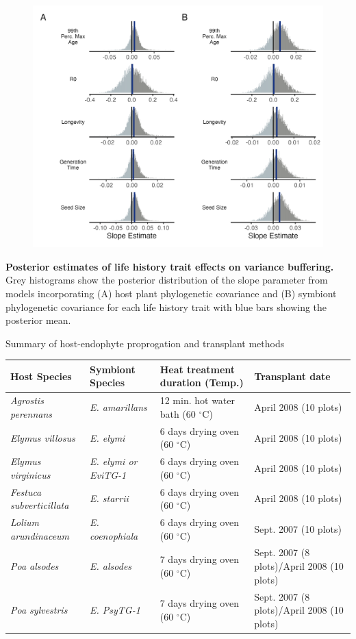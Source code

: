 \documentclass[12pt]{article}
\begin{document}
\begin{figure}
	\centering
	\includegraphics[width=.8\linewidth]{lh_slopes_plot.png}
\end{figure}
 \textbf{Posterior estimates of life history trait effects on variance buffering.} Grey histograms show the posterior distribution of the slope parameter from models incorporating (A) host plant phylogenetic covariance and (B) symbiont phylogenetic covariance for each life history trait with blue bars showing the posterior mean.
\newpage




 Summary of host-endophyte proprogation and transplant methods\\
\begin{table}[ht]
	\begin{adjustbox}{width=1\textwidth}
\begin{tabular}{|l|l|l|l|}
\hline
	\bf{Host Species} & \bf{Symbiont Species} & \bf{Heat treatment duration (Temp.)}& \bf{Transplant date }\\
	        \hline
	\emph{Agrostis perennans} & \emph{E. amarillans}&12 min. hot water bath (60 $^{\circ}$C)&April 2008 (10 plots)\\
	\emph{Elymus villosus} &\emph{E. elymi}&6 days drying oven (60 $^{\circ}$C)&April 2008 (10 plots)\\
	\emph{Elymus virginicus} &\emph{E. elymi or EviTG-1}&6 days drying oven (60 $^{\circ}$C)&April 2008 (10 plots)\\
	 \emph{Festuca subverticillata} &\emph{E. starrii}&6 days drying oven (60 $^{\circ}$C)&April 2008 (10 plots)\\
	 \emph{Lolium arundinaceum} &\emph{E. coenophiala}&6 days drying oven (60 $^{\circ}$C)& Sept. 2007 (10 plots)\\
	 \emph{Poa alsodes} &\emph{E. alsodes}& 7 days drying oven (60 $^{\circ}$C)&Sept. 2007 (8 plots)/April 2008 (10 plots)\\
	 \emph{Poa sylvestris}&\emph{E. PsyTG-1}&7 days drying oven (60 $^{\circ}$C)& Sept. 2007 (8 plots)/April 2008 (10 plots)\\
	 \hline
\end{tabular}
\end{adjustbox}
\end{table}
\end{document}

